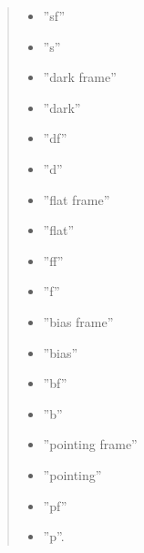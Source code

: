 \documentclass[letterpaper,10pt,english]{sphinxmanual}
\begin{document}
\begin{fulllineitems}
\begin{fulllineitems}
\begin{quote}
\begin{description}
\begin{itemize}
\begin{itemize}
\item {} 
\sphinxAtStartPar
”sf”

\item {} 
\sphinxAtStartPar
”s”

\item {} 
\sphinxAtStartPar
”dark frame”

\item {} 
\sphinxAtStartPar
”dark”

\item {} 
\sphinxAtStartPar
”df”

\item {} 
\sphinxAtStartPar
”d”

\item {} 
\sphinxAtStartPar
”flat frame”

\item {} 
\sphinxAtStartPar
”flat”

\item {} 
\sphinxAtStartPar
”ff”

\item {} 
\sphinxAtStartPar
”f”

\item {} 
\sphinxAtStartPar
”bias frame”

\item {} 
\sphinxAtStartPar
”bias”

\item {} 
\sphinxAtStartPar
”bf”

\item {} 
\sphinxAtStartPar
”b”

\item {} 
\sphinxAtStartPar
”pointing frame”

\item {} 
\sphinxAtStartPar
”pointing”

\item {} 
\sphinxAtStartPar
”pf”

\item {} 
\sphinxAtStartPar
”p”.

\end{itemize}


\end{itemize}

\end{description}\end{quote}

\end{fulllineitems}



\end{fulllineitems}
\end{document}
